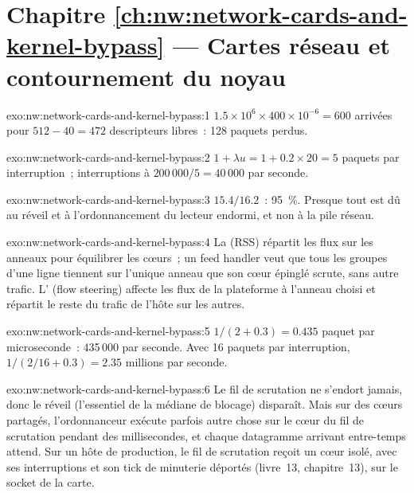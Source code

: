 \section*{Chapitre \ref{ch:nw:network-cards-and-kernel-bypass} --- Cartes réseau et contournement du noyau}

\begin{solution}{exo:nw:network-cards-and-kernel-bypass:1}
$1.5 \times 10^6 \times 400 \times 10^{-6} = 600$ arrivées pour $512 - 40 = 472$ descripteurs libres~: 128 paquets perdus.
\end{solution}

\begin{solution}{exo:nw:network-cards-and-kernel-bypass:2}
$1 + \lambda u = 1 + 0.2 \times 20 = 5$ paquets par interruption~; interruptions à $200\,000 / 5 = 40\,000$ par seconde.
\end{solution}

\begin{solution}{exo:nw:network-cards-and-kernel-bypass:3}
$15.4 / 16.2$~: 95~\%. Presque tout est dû au réveil et à l'ordonnancement du lecteur endormi, et non à la pile réseau.
\end{solution}

\begin{solution}{exo:nw:network-cards-and-kernel-bypass:4}
La  (RSS) répartit les flux sur les anneaux pour équilibrer les cœurs~; un feed handler veut que tous les groupes d'une ligne
tiennent sur l'unique anneau que son cœur épinglé scrute, sans autre trafic. L' (flow steering) affecte les flux de la plateforme à l'anneau choisi et répartit le reste du trafic de l'hôte sur les autres.
\end{solution}

\begin{solution}{exo:nw:network-cards-and-kernel-bypass:5}
$1/(2 + 0.3) = 0.435$ paquet par microseconde~: 435\,000 par seconde. Avec 16 paquets par interruption, $1/(2/16 + 0.3) = 2.35$ millions par seconde.
\end{solution}

\begin{solution}{exo:nw:network-cards-and-kernel-bypass:6}
Le fil de scrutation ne s'endort jamais, donc le réveil (l'essentiel de la médiane de blocage) disparaît. Mais sur des cœurs partagés, l'ordonnanceur exécute parfois
autre chose sur le cœur du fil de scrutation pendant des millisecondes, et chaque datagramme arrivant entre-temps attend. Sur un hôte de production, le fil de scrutation
reçoit un cœur isolé, avec ses interruptions et son tick de minuterie déportés (livre~13, chapitre~13), sur le socket de la carte.
\end{solution}

